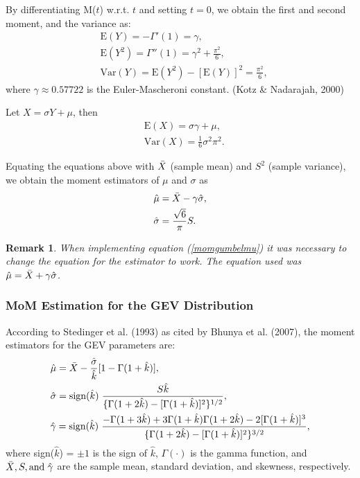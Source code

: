 \documentclass{article}
\newtheorem*{remark}{Remark}
\begin{document}
By differentiating M($t$) w.r.t. $t$ and setting $t = 0$, we obtain the first and second moment, and the variance as:  
\begin{align*}
&\textrm{E}(Y) = -\Gamma'(1) = \gamma,\\
&\textrm{E}(Y^{2}) = \Gamma''(1) = \gamma^{2} + \frac{\pi^2}{6},\\
&\textrm{Var}(Y) = \textrm{E}(Y^{2}) - [\textrm{E}(Y)]^{2} = \frac{\pi^2}{6},
\end{align*}
where $\gamma \approx 0.57722$ is the Euler-Mascheroni constant. (Kotz \& Nadarajah, 2000)

Let $X = \sigma Y + \mu$, then
\begin{align*}
&\textrm{E}(X) = \sigma \gamma + \mu, \\
&\textrm{Var}(X) = \frac{1}{6}\sigma^{2}\pi^{2}.
\end{align*}

Equating the equations above with $\Bar{X}$ (sample mean) and $S^{2}$ (sample variance), we obtain the moment estimators of $\mu$ and $\sigma$ as
\begin{align}
\hat{\mu} &= \Bar{X} - \gamma \hat{\sigma}, \label{momgumbelmu}\\
\hat{\sigma} &= \frac{\sqrt{6}}{\pi}S. \label{momgumbelsigma}
\end{align}
\begin{remark}
When implementing equation (\ref{momgumbelmu}) it was necessary to change the equation for the estimator to work. The equation used was $\hat{\mu} = \Bar{X} + \gamma \hat{\sigma}$. 
\end{remark}

\subsubsection{MoM Estimation for the GEV Distribution}
According to Stedinger et al. (1993) as cited by Bhunya et al. (2007), the moment estimators for the GEV parameters are:
\begin{align}
&\hat{\mu} = \Bar{X} - \frac{\hat{\sigma}}{\hat{k}}[1-\Gamma(1+\hat{k})],\label{momgev1} \\
&\hat{\sigma} = \textrm{sign}(\hat{k})\hspace{3pt}\frac{S\hat{k}}{\{\Gamma(1+2\hat{k})-[\Gamma(1+\hat{k})]^{2}\}^{1/2}},\label{momgev2} \\
&\hat{\gamma} = \textrm{sign}(\hat{k})\hspace{3pt}\frac{- \Gamma(1+3\hat{k})+ 3\Gamma(1+\hat{k})\Gamma(1+2\hat{k})-2[\Gamma(1+\hat{k})]^{3}}{\{\Gamma(1+2\hat{k})-[\Gamma(1+\hat{k})]^{2}\}^{3/2}},\label{momgev3}
\end{align}
where sign($\hat{k}$) = $\pm 1$ is the sign of $\hat{k}$, $\Gamma(\cdot)$ is the gamma function, and $\Bar{X}, S, \textrm{and} \hspace{3pt} \hat{\gamma}$ are the sample mean, standard deviation, and skewness, respectively.
 
\end{document}
